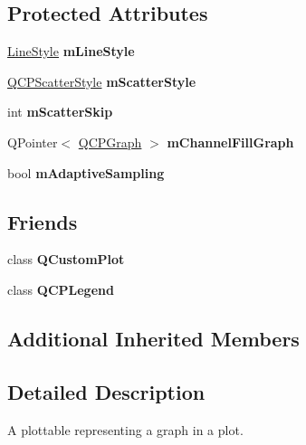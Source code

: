 \subsection*{Protected Attributes}
\begin{DoxyCompactItemize}
\item 
\mbox{\label{classQCPGraph_a8604fd98402035a63375849f7341ee25}} 
\hyperlink{classQCPGraph_ad60175cd9b5cac937c5ee685c32c0859}{Line\+Style} {\bfseries m\+Line\+Style}
\item 
\mbox{\label{classQCPGraph_a4aa36241f166ccd1f75fc8f24e4a3247}} 
\hyperlink{classQCPScatterStyle}{Q\+C\+P\+Scatter\+Style} {\bfseries m\+Scatter\+Style}
\item 
\mbox{\label{classQCPGraph_a4ca1e50fbfe8307022b42a6f6178fae0}} 
int {\bfseries m\+Scatter\+Skip}
\item 
\mbox{\label{classQCPGraph_a2f1777c7accf8244fc640c33f0b04577}} 
Q\+Pointer$<$ \hyperlink{classQCPGraph}{Q\+C\+P\+Graph} $>$ {\bfseries m\+Channel\+Fill\+Graph}
\item 
\mbox{\label{classQCPGraph_aa951e78aeba714cf443be6da2e52502e}} 
bool {\bfseries m\+Adaptive\+Sampling}
\end{DoxyCompactItemize}
\subsection*{Friends}
\begin{DoxyCompactItemize}
\item 
\mbox{\label{classQCPGraph_a1cdf9df76adcfae45261690aa0ca2198}} 
class {\bfseries Q\+Custom\+Plot}
\item 
\mbox{\label{classQCPGraph_a8429035e7adfbd7f05805a6530ad5e3b}} 
class {\bfseries Q\+C\+P\+Legend}
\end{DoxyCompactItemize}
\subsection*{Additional Inherited Members}


\subsection{Detailed Description}
A plottable representing a graph in a plot. 



